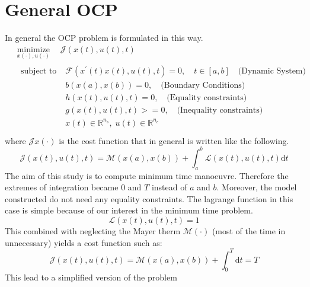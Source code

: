 \section{General OCP}
%
In general the OCP problem is formulated in this way.
%
\begin{equation}
    \begin{aligned}
    &\underset{x(\cdot), u(\cdot)}{\operatorname{minimize}} \quad \mathcal{J}(x(t), u(t), t)\\
    &\begin{aligned}
        {\text { subject to }} \;
        & \mathcal{F}(x^{\prime}(t)x(t),u(t),t)=0, \quad t \in[a, b] \quad \text{(Dynamic System)}\\
        & b(x(a),x(b))=0, \quad \text{(Boundary Conditions)}\\
        & h(x(t),u(t),t)=0, \quad \text{(Equality constraints)}\\
        & g(x(t),u(t),t)>=0, \quad \text{(Inequality constraints)}\\
        & x(t) \in \mathbb{R}^{n_s}, \; u(t) \in \mathbb{R}^{n_c}
    \end{aligned}\\
    \end{aligned}
\end{equation}
%
where $\mathcal{J}x(\cdot)$ is the cost function that in general is written like the following.
%
\begin{equation}
    \mathcal{J}(x(t), u(t), t)=\mathcal{M}(x(a), x(b))+\int_{a}^{b} \mathcal{L}(x(t), u(t), t) \mathrm{d} t
\end{equation}
%
The aim of this study is to compute minimum time manoeuvre. Therefore the extremes of integration became $0$ and $T$ instead of $a$ and $b$. Moreover, the model constructed do not need any equality constraints. The lagrange function in this case is simple because of our interest in the minimum time problem.
%
\begin{equation}
    \mathcal{L}(x(t), u(t), t) = 1
\end{equation}
%
This combined with neglecting the Mayer therm $\mathcal{M}(\cdot)$ (most of the time in unnecessary) yields a cost function such as:
%
\begin{equation}
    \mathcal{J}(x(t), u(t), t) = \mathcal{M}(x(a), x(b))+\int_{0}^{T}  \mathrm{d} t = T 
\end{equation}
%
This lead to a simplified version of the problem
%
